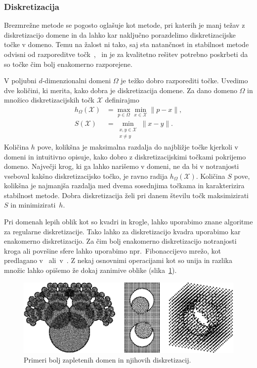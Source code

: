 \documentclass[12pt,a4paper,twoside]{article}
\theoremstyle{definition} %
\theoremstyle{plain} %
\numberwithin{equation}{section}
\newcommand{\X}{\mathcal{X}}
\begin{document}
\subsubsection{Diskretizacija}
Brezmrežne metode se pogosto oglašuje kot metode, pri katerih je manj težav z diskretizacijo domene
in da lahko kar naključno porazdelimo diskretizacijske točke v domeno. Temu na žalost ni tako, saj
sta natančnost in stabilnost metode odvisni od razporeditve
točk~\cite[slika~8]{kosec2016local},~\cite{amani2012mixed} in je za kvalitetno rešitev potrebno
poskrbeti da so točke čim bolj enakomerno razporejene.

V poljubni $d$-dimenzionalni domeni $\Omega$ je težko dobro razporediti točke.
Uvedimo dve količini, ki merita, kako dobra je diskretizacija domene.
Za dano domeno $\Omega$ in množico diskretizacijskih točk $\X$ definirajmo
\begin{align}
  h_\Omega(\X) &= \max_{p \in \Omega} \min_{x \in \X} \|p - x\|, \\
  \label{eq:def-hs}
  S(\X) &= \min_{\substack{x, y \in \X \\ x \neq y}} \|x-y\|.
\end{align}
Količina $h$ pove, kolikšna je maksimalna razdalja do najbližje točke kjerkoli v domeni in intuitivno
opisuje, kako dobro z diskretizacijskimi točkami pokrijemo domeno. Največji krog, ki ga lahko
narišemo v domeni, ne da bi v notranjosti vseboval kakšno diskretizacijsko točko, je ravno radija
$h_\Omega(\X)$. Količina $S$ pove, kolikšna je najmanjša razdalja med dvema sosednjima točkama in
karakterizira stabilnost metode. Dobra diskretizacija želi pri danem številu točk maksimizirati $S$
in minimizirati~$h$.

Pri domenah lepih oblik kot so kvadri in krogle, lahko uporabimo znane algoritme za regularne
diskretizacije. Tako lahko za diskretizacijo kvadra uporabimo kar enakomerno diskretizacijo. Za
čim bolj enakomerno diskretizacijo notranjosti kroga ali površine sfere lahko uporabimo
npr.~Fibonaccijevo mrežo, kot predlagano v~\cite{hannay2004fibonacci}
ali~v~\cite{gonzalez2010measurement}.
Z nekaj osnovnimi operacijami kot so unija in razlika množic lahko opišemo že dokaj zanimive oblike
(slika~\ref{fig:domains}).

\begin{figure}[!ht]
  \centering
  \includegraphics[width=\textwidth]{images/weird_domains.pdf}
  \caption{Primeri bolj zapletenih domen in njihovih diskretizacij.}
  \label{fig:domains}
\end{figure}
\end{document}

